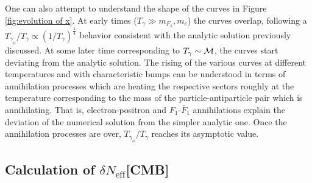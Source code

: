 \documentclass[12pt]{article}
\begin{document}
One can also attempt to understand the shape of the curves in Figure \ref{fig:evolution of x}. At early times ($T _{\gamma} \gg m _{F_1},m _e$) the curves overlap, following a $T _{\gamma _{_D}}/T _{\gamma} \propto \left (1/T _{\gamma} \right ) ^{\frac{1}{4}}$ behavior consistent with the analytic solution previously discussed. At some later time corresponding to $T _{\gamma} \sim {\cal M}$, the curves start deviating from the analytic solution. The rising of the various curves at different temperatures and with characteristic bumps can be understood in terms of annihilation processes which are heating the respective sectors roughly at the temperature corresponding to the mass of the particle-antiparticle pair which is annihilating. That is, electron-positron and $F _1$-$\overline{F} _1$ annihilations explain the deviation of the numerical solution from the simpler analytic one. Once the annihilation processes are over, $T _{\gamma _{_D}}/T _{\gamma}$ reaches its asymptotic value.

\subsection{Calculation of $\delta N _{\text{eff}}$[CMB]}
\end{document}
